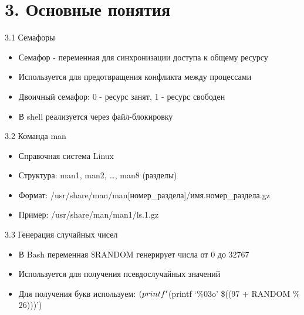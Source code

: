 \documentclass[
  ignorenonframetext,
  aspectratio=169,
  russian,
]{beamer}
\providecommand{\tightlist}{%
  \setlength{\itemsep}{0pt}\setlength{\parskip}{0pt}}
\begin{document}
\section{3. Основные
понятия}\label{ux43eux441ux43dux43eux432ux43dux44bux435-ux43fux43eux43dux44fux442ux438ux44f}

\begin{frame}{3.1 Семафоры}
\label{ux441ux435ux43cux430ux444ux43eux440ux44b}
\begin{itemize}[<+->]
\tightlist
\item
  Семафор - переменная для синхронизации доступа к общему ресурсу
\item
  Используется для предотвращения конфликта между процессами
\item
  Двоичный семафор: 0 - ресурс занят, 1 - ресурс свободен
\item
  В shell реализуется через файл-блокировку
\end{itemize}
\end{frame}

\begin{frame}{3.2 Команда man}
\label{ux43aux43eux43cux430ux43dux434ux430-man}
\begin{itemize}[<+->]
\tightlist
\item
  Справочная система Linux
\item
  Структура: man1, man2, \ldots, man8 (разделы)
\item
  Формат: /usr/share/man/man{[}номер\_раздела{]}/имя.номер\_раздела.gz
\item
  Пример: /usr/share/man/man1/ls.1.gz
\end{itemize}
\end{frame}

\begin{frame}{3.3 Генерация случайных чисел}
\label{ux433ux435ux43dux435ux440ux430ux446ux438ux44f-ux441ux43bux443ux447ux430ux439ux43dux44bux445-ux447ux438ux441ux435ux43b}
\begin{itemize}[<+->]
\tightlist
\item
  В Bash переменная \$RANDOM генерирует числа от 0 до 32767
\item
  Используется для получения псевдослучайных значений
\item
  Для получения букв используем: \((printf '\\\)(printf \enquote*{\%03o}
  \$((97 + RANDOM \% 26)))')
\end{itemize}
\end{frame}
\end{document}
